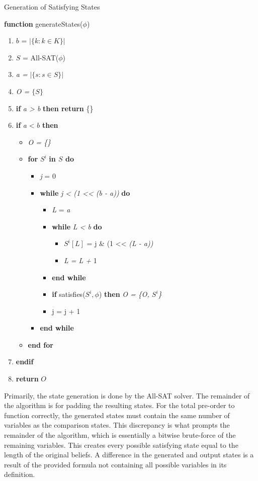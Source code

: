 \documentclass[english]{article}
\begin{document}
\begin{algorithm}[H]
\caption{Generation of Satisfying States}

\textbf{function }generateStates($\phi$)
\begin{enumerate}
\item $b$ = $|\{k:k\in K\}|$
\item $S$ = All-SAT($\phi$)
\item \emph{a = }$|\{s:s\in S\}|$
\item \emph{O = $\{S\}$}
\item \textbf{if }\emph{a > b }\textbf{then return }\{\}
\item \textbf{if }\emph{a} < $b$\textbf{ then}
\begin{itemize}
\item \emph{O = \{\}}
\item \textbf{for }$S^{i}$ \textbf{in $S$ do}
\begin{itemize}
\item \emph{j }= 0
\item \textbf{while }\emph{j < (1 <\textcompwordmark < (b - a))} \textbf{do}
\begin{itemize}
\item \emph{L} = \emph{a} 
\item \textbf{while }\emph{L < b }\textbf{do}
\begin{itemize}
\item $S^{i}[L]$ = j \& (1 <\textcompwordmark < \emph{(L - a))}
\item \emph{L = L + }1
\end{itemize}
\item \textbf{end while}
\item \textbf{if }satisfies($S^{i},\phi$) \textbf{then }\emph{O = \{O,
$S^{i}$\}}
\item j = j + 1
\end{itemize}
\item \textbf{end while}
\end{itemize}
\item \textbf{end for}
\end{itemize}
\item \textbf{endif}
\item \textbf{return }$O$
\end{enumerate}
\end{algorithm}

\noindent Primarily, the state generation is done by the All-SAT solver.
The remainder of the algorithm is for padding the resulting states.
For the total pre-order to function correctly, the generated states
must contain the same number of variables as the comparison states.
This discrepancy is what prompts the remainder of the algorithm, which
is essentially a bitwise brute-force of the remaining variables. This
creates every possible satisfying state equal to the length of the
original beliefs. A difference in the generated and output states
is a result of the provided formula not containing all possible variables
in its definition.
\end{document}
